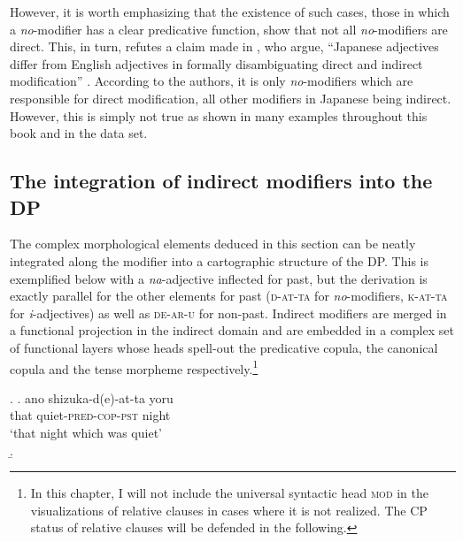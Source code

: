 \documentclass [output=book,colorlinks,citecolor=brown]{langscibook}
\begin{document}
However, it is worth emphasizing that the existence of such cases, those in which a \textit{no}-modifier has a clear predicative function, show that not all \textit{no}-modifiers are direct. This, in turn, refutes a claim made in \citet{nagano:2015:RA}, who argue, ``Japanese adjectives differ from English adjectives in formally disambiguating direct and indirect modification'' \citep[124]{nagano:2015:RA}. According to the authors, it is only \textit{no}-modifiers which are responsible for direct modification, all other modifiers in Japanese being indirect. However, this is simply not true as shown in many examples throughout this book and in the data set. %

\subsection{The integration of indirect modifiers into the DP}

The complex morphological elements deduced in this section can be neatly integrated along the modifier into a cartographic structure of the DP. This is exemplified below with a \textit{na}-adjective inflected for past, but the derivation is exactly parallel for the other elements for past (\textsc{d-at-ta} for \textit{no}-modifiers, \textsc{k-at-ta} for \textit{i}-adjectives) as well as \textsc{de-ar-u} for non-past. Indirect modifiers are merged in a functional projection in the indirect domain and are embedded in a complex set of functional layers whose heads spell-out the predicative copula, the canonical copula and the tense morpheme respectively.\footnote{In this chapter, I will not include the universal syntactic head \textsc{mod} in the visualizations of relative clauses in cases where it is not realized. The CP status of relative clauses will be defended in the following.}

\newpage

\ex. \ag. ano shizuka-d(e)-at-ta yoru \\
that quiet-\textsc{pred-cop-pst} night\\
`that night which was quiet'\\
\b. 
\end{document}
